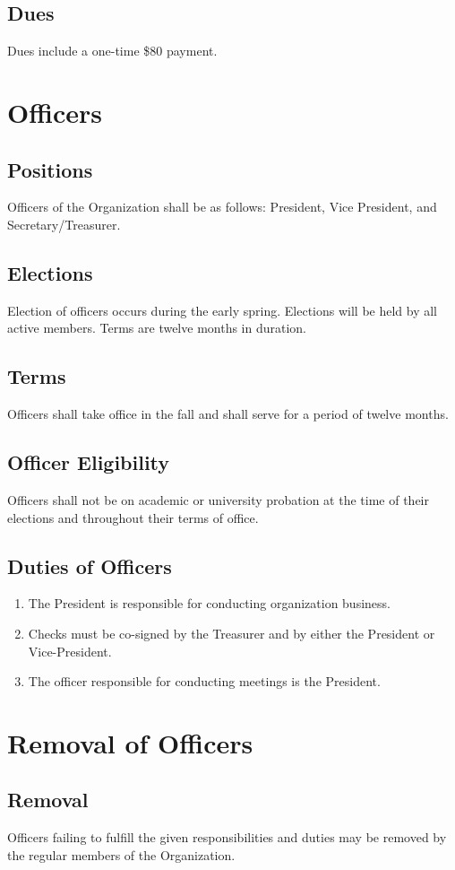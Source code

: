 \documentclass{article}
\begin{document}
\subsection{Dues}
Dues include a one-time \$80 payment.

\section{Officers}
\subsection{Positions}
Officers of the Organization shall be as follows: President, Vice President, and Secretary/Treasurer.
\subsection{Elections}
Election of officers occurs during the early spring. Elections will be held by all active members. Terms are twelve months in duration.
\subsection{Terms}
Officers shall take office in the fall and shall serve for a period of twelve months.
\subsection{Officer Eligibility}
Officers shall not be on academic or university probation at the time of their elections and throughout their terms of office.
\subsection{Duties of Officers}
\begin{enumerate}[label=(\Alph*)]
\item The President is responsible for conducting organization business.
\item Checks must be co-signed by the Treasurer and by either the President or
Vice-President.
\item The officer responsible for conducting meetings is the President.
\end{enumerate}

\section{Removal of Officers}
\subsection{Removal}
Officers failing to fulfill the given responsibilities and duties may be removed by the regular members of the Organization.
\end{document}
